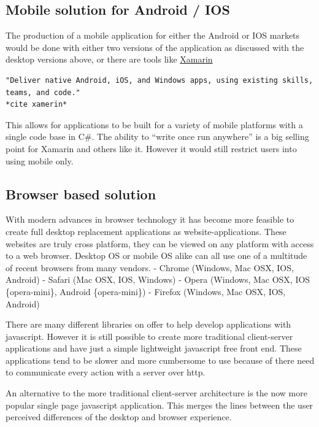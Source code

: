 \subsection{Mobile solution for Android /
IOS}\label{mobile-solution-for-android-ios}

The production of a mobile application for either the Android or IOS
markets would be done with either two versions of the application as
discussed with the desktop versions above, or there are tools like
\href{https://www.xamarin.com/platform}{Xamarin}

\begin{verbatim}
"Deliver native Android, iOS, and Windows apps, using existing skills,
teams, and code."
*cite xamerin*
\end{verbatim}

This allows for applications to be built for a variety of mobile
platforms with a single code base in C\#. The ability to ``write once
run anywhere'' is a big selling point for Xamarin and others like it.
However it would still restrict users into using mobile only.

\subsection{Browser based solution}\label{browser-based-solution}

With modern advances in browser technology it has become more feasible
to create full desktop replacement applications as website-applications.
These websites are truly cross platform, they can be viewed on any
platform with access to a web browser. Desktop OS or mobile OS alike can
all use one of a multitude of recent browsers from many vendors. -
Chrome (Windows, Mac OSX, IOS, Android) - Safari (Mac OSX, IOS, Windows)
- Opera (Windows, Mac OSX, IOS \{opera-mini\}, Android \{opera-mini\}) -
Firefox (Windows, Mac OSX, IOS, Android)

There are many different libraries on offer to help develop applications
with javascript. However it is still possible to create more traditional
client-server applications and have just a simple lightweight javascript
free front end. These applications tend to be slower and more cumbersome
to use because of there need to communicate every action with a server
over http.

An alternative to the more traditional client-server architecture is the
now more popular single page javascript application. This merges the
lines between the user perceived differences of the desktop and browser
experience.

